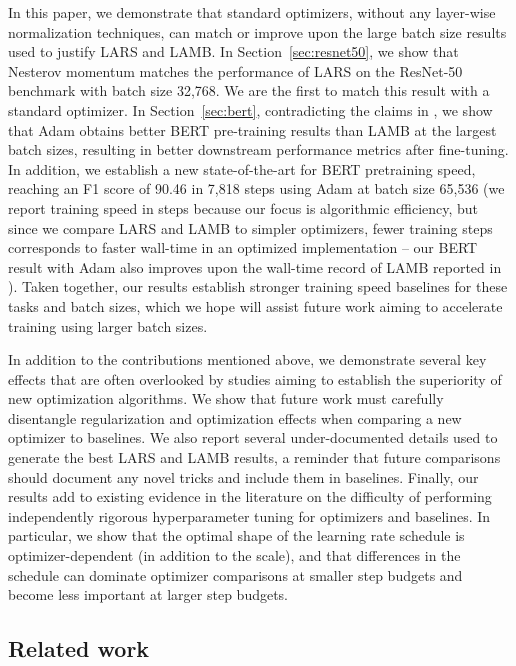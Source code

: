\documentclass{article}
\begin{document}
In this paper, we demonstrate that standard optimizers, without any layer-wise normalization techniques, can match or improve upon the large batch size results used to justify LARS and LAMB. In Section~\ref{sec:resnet50}, we show that Nesterov momentum \citep{nesterov1983method} matches the performance of LARS on the ResNet-50 benchmark with batch size 32,768. We are the first to match this result with a standard optimizer.
In Section~\ref{sec:bert}, contradicting the claims in \citet{you2019lamb}, we show that Adam obtains better BERT pre-training results than LAMB at the largest batch sizes, resulting in better downstream performance metrics after fine-tuning.
In addition, we establish a new state-of-the-art for BERT pretraining speed, reaching an F1 score of 90.46 in 7,818 steps using Adam at batch size 65,536 (we report training speed in steps because our focus is algorithmic efficiency, but since we compare LARS and LAMB to simpler optimizers, fewer training steps corresponds to faster wall-time in an optimized implementation -- our BERT result with Adam also improves upon the wall-time record of LAMB reported in \citealt{you2019lamb}).
Taken together, our results establish stronger training speed baselines for these tasks and batch sizes, which we hope will assist future work aiming to accelerate training using larger batch sizes.


In addition to the contributions mentioned above, we demonstrate several key effects that are often overlooked by studies aiming to establish the superiority of new optimization algorithms. We show that future work must carefully disentangle regularization and optimization effects when comparing a new optimizer to baselines.
We also report several under-documented details used to generate the best LARS and LAMB results, a reminder that future comparisons should document any novel tricks and include them in baselines.
Finally, our results add to existing evidence in the literature on the difficulty of performing independently rigorous hyperparameter tuning for optimizers and baselines. In particular, we show that the optimal shape of the learning rate schedule is optimizer-dependent (in addition to the scale), and that differences in the schedule can dominate optimizer comparisons at smaller step budgets and become less important at larger step budgets.



\subsection{Related work}\label{sec:related-work}
\end{document}
